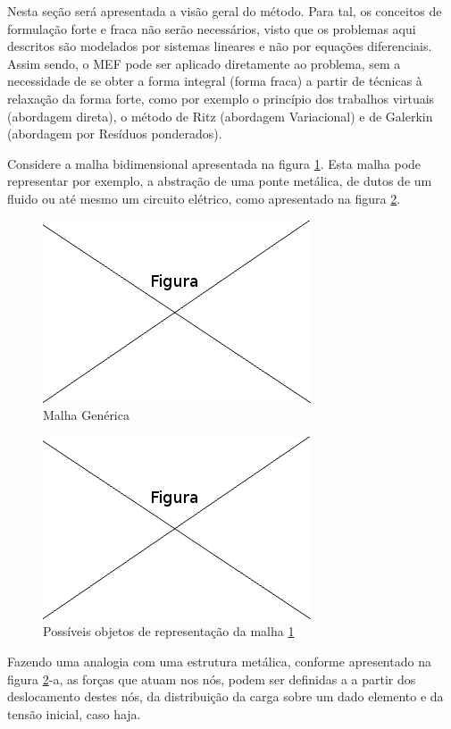 Nesta seção será apresentada a visão geral do método. Para tal, os conceitos de formulação forte e fraca não serão necessários, visto que os problemas aqui descritos são modelados por sistemas lineares e não por equações diferenciais. Assim sendo, o MEF pode ser aplicado diretamente ao problema, sem a necessidade de se obter a forma integral (forma fraca) a partir de técnicas à relaxação da forma forte, como por exemplo o princípio dos trabalhos virtuais (abordagem direta), o método de Ritz (abordagem Variacional) e de Galerkin (abordagem por Resíduos ponderados).

Considere a malha bidimensional  apresentada na figura \ref{fig:malhaGenerica}. Esta malha pode representar por exemplo, a abstração de uma ponte metálica, de dutos de um fluido ou até mesmo um circuito elétrico, como apresentado na figura \ref{fig:repMalhaGenerica}.
\begin{figure}[!htb]
\centering
\includegraphics[scale=0.5]{figuras/temp.png}
\caption{Malha Genérica}
\label{fig:malhaGenerica}
\end{figure}

\begin{figure}[!htb]
\centering
\includegraphics[scale=0.5]{figuras/temp.png}
\caption{Possíveis objetos de representação da malha \ref{fig:malhaGenerica}}
\label{fig:repMalhaGenerica}
\end{figure}


 Fazendo uma analogia com uma estrutura metálica, conforme apresentado na figura \ref{fig:repMalhaGenerica}-a, as forças que atuam nos nós, podem ser definidas  a a partir dos deslocamento destes nós, da distribuição da carga sobre um dado elemento e da tensão inicial, caso haja.
 
